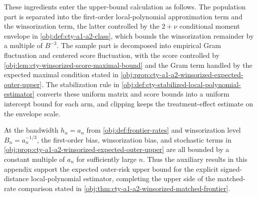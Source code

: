 These ingredients enter the upper-bound calculation as follows. The population part is separated into the first-order local-polynomial approximation term and the winsorization term, the latter controlled by the \(2+\nu\) conditional moment envelope in \cref{obj:def:cty-a1-a2-class}, which bounds the winsorization remainder by a multiple of \(B^{-3}\). The sample part is decomposed into empirical Gram fluctuation and centered score fluctuation, with the score controlled by \cref{obj:lem:cty-winsorized-score-maximal-bound} and the Gram term handled by the expected maximal condition stated in \cref{obj:prop:cty-a1-a2-winsorized-expected-outer-upper}. The stabilization rule in \cref{obj:def:cty-stabilized-local-polynomial-estimator} converts these uniform matrix and score bounds into a uniform intercept bound for each arm, and clipping keeps the treatment-effect estimate on the envelope scale.

At the bandwidth \(h_n=a_n\) from \cref{obj:def:frontier-rates} and winsorization level \(B_n=a_n^{-1/3}\), the first-order bias, winsorization bias, and stochastic terms in \cref{obj:prop:cty-a1-a2-winsorized-expected-outer-upper} are all bounded by a constant multiple of \(a_n\) for sufficiently large \(n\). Thus the auxiliary results in this appendix support the expected outer-risk upper bound for the explicit signed-distance local-polynomial estimator, completing the upper side of the matched-rate comparison stated in \cref{obj:thm:cty-a1-a2-winsorized-matched-frontier}.
